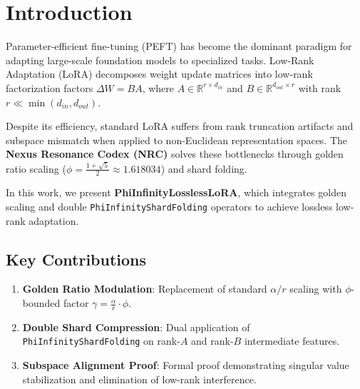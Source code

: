 \section{Introduction}
Parameter-efficient fine-tuning (PEFT) has become the dominant paradigm for adapting large-scale foundation models to specialized tasks. Low-Rank Adaptation (LoRA) decomposes weight update matrices into low-rank factorization factors $\Delta W = B A$, where $A \in \mathbb{R}^{r \times d_{in}}$ and $B \in \mathbb{R}^{d_{out} \times r}$ with rank $r \ll \min(d_{in}, d_{out})$.

Despite its efficiency, standard LoRA suffers from rank truncation artifacts and subspace mismatch when applied to non-Euclidean representation spaces. The \textbf{Nexus Resonance Codex (NRC)} solves these bottlenecks through golden ratio scaling ($\phi = \frac{1+\sqrt{5}}{2} \approx 1.618034$) and shard folding.

In this work, we present \textbf{PhiInfinityLosslessLoRA}, which integrates golden scaling and double \texttt{PhiInfinityShardFolding} operators to achieve lossless low-rank adaptation.

\subsection{Key Contributions}
\begin{enumerate}[label=\textbf{\arabic*.}]
    \item \textbf{Golden Ratio Modulation}: Replacement of standard $\alpha/r$ scaling with $\phi$-bounded factor $\gamma = \frac{\alpha}{r} \cdot \phi$.
    \item \textbf{Double Shard Compression}: Dual application of \texttt{PhiInfinityShardFolding} on rank-$A$ and rank-$B$ intermediate features.
    \item \textbf{Subspace Alignment Proof}: Formal proof demonstrating singular value stabilization and elimination of low-rank interference.
\end{enumerate}